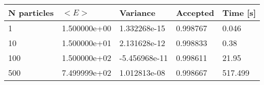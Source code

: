 \begin{table}[h!]
\centering 
\begin{tabular}{|l|l|l|l|l|}
\hline 
N particles & $<E>$ & Variance & Accepted & Time [s]\\ 
 \hline 
1 & 1.500000e+00 & 1.332268e-15 & 0.998767 & 0.046 \\ \hline 
10 & 1.500000e+01 & 2.131628e-12 & 0.998833 & 0.38 \\ \hline 
100 & 1.500000e+02 & -5.456968e-11 & 0.998611 & 21.95 \\ \hline 
500 & 7.499999e+02 & 1.012813e-08 & 0.998667 & 517.499 \\ \hline 
\end{tabular}
\label{tab:in3} 
\end{table} 
